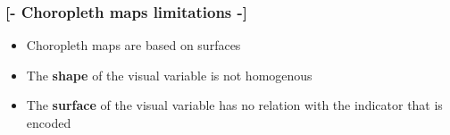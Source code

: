 \documentclass[xcolor=x11names,compress]{beamer}
\renewcommand{\(}{\begin{columns}}
\renewcommand{\)}{\end{columns}}
\newcommand{\<}[1]{\begin{column}{#1}}
\renewcommand{\>}{\end{column}}
\begin{document}


\begin{frame} %
\frametitle{\textcolor{brique}{[-  \textbf{Choropleth maps limitations} -]}}
\begin{itemize}[<+-|alert@+>]
    \item Choropleth maps are based on surfaces
    \item The \textbf{shape} of the visual variable is not homogenous
    \item The \textbf{surface} of the visual variable has no relation with the indicator that is encoded
\end{itemize}
\end{frame}
\end{document}
